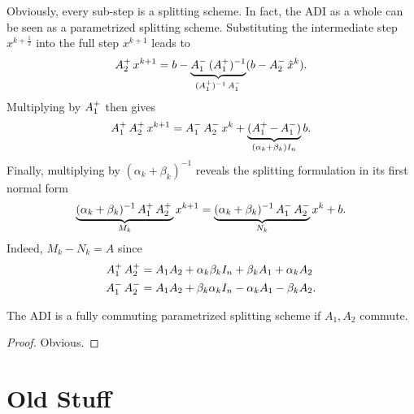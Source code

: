 Obviously, every sub-step is a splitting scheme.
In fact, the ADI as a whole can be seen as a parametrized splitting scheme.
Substituting the intermediate step $x^{k+\frac{1}{2}}$ into the full step $x^{k+1}$ leads to
\begin{equation*}
  \mathop{A_2^+} x^{k+1}
  = b - \underbrace{
    \mathop{A_1^-}\mathop{(\mathop{A_1^+})^{-1}}
  }_{\mathop{(\mathop{A_1^+})^{-1}}\mathop{A_1^-}}
  (b - \mathop{A_2^-} \hat x^k)
  .
\end{equation*}
Multiplying by $\mathop{A_1^+}$ then gives
\begin{equation*}
  \Aip\Aiip x^{k+1} = \Aim\Aiim x^k +
  \underbrace{%
  (\Aip - \Aim)
  }_{(\alpha_k + \beta_k) I_n}
  b
  .
\end{equation*}
Finally, multiplying by $(\alpha_k + \beta_k)^{-1}$ reveals the splitting formulation in its first normal form
\begin{equation}
\label{eq:adi:general1step}
  \underbrace{
    (\alpha_k + \beta_k)^{-1} \mathop{A_1^+}\mathop{A_2^+} \\
  }_{M_k}
  x^{k+1} =
  \underbrace{
    (\alpha_k + \beta_k)^{-1} \mathop{A_1^-}\mathop{A_2^-}
  }_{N_k}
  x^k + b
  .
\end{equation}
Indeed, $M_k - N_k = A$ since
\begin{align*}
  \mathop{A_1^+}\mathop{A_2^+} &= A_1A_2 + \alpha_k\beta_k I_n + \beta_k A_1 + \alpha_k A_2 \\
  \mathop{A_1^-}\mathop{A_2^-} &= A_1A_2 + \beta_k\alpha_k I_n - \alpha_k A_1 - \beta_k A_2
  .
\end{align*}

\begin{corollary}
  The ADI is a fully commuting parametrized splitting scheme if $A_1, A_2$ commute.
\end{corollary}
\begin{proof}
  Obvious.
\end{proof}


\section{Old Stuff}

